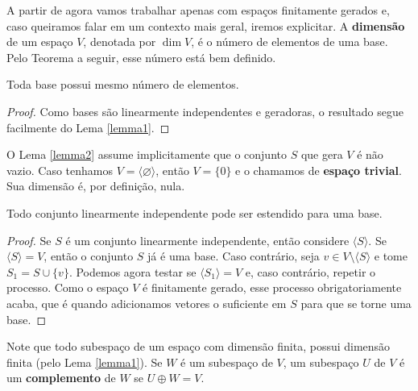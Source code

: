 A partir de agora vamos trabalhar apenas com espaços finitamente gerados e, caso queiramos falar em um contexto mais geral, iremos explicitar. A \textbf{dimensão} de um espaço $V$, denotada por $\dim V$, é o número de elementos de uma base. Pelo Teorema a seguir, esse número está bem definido.

\begin{theorem}
    Toda base possui mesmo número de elementos.
\end{theorem}
\begin{proof}
    Como bases são linearmente independentes e geradoras, o resultado segue facilmente do Lema \ref{lemma1}.
\end{proof}

O Lema \ref{lemma2} assume implicitamente que o conjunto $S$ que gera $V$ é não vazio. Caso tenhamos $V = \langle\varnothing\rangle$, então $V = \{0\}$ e o chamamos de \textbf{espaço trivial}. Sua dimensão é, por definição, nula.

\begin{theorem}
    Todo conjunto linearmente independente pode ser estendido para uma base.
\end{theorem}
\begin{proof}
    Se $S$ é um conjunto linearmente independente, então considere $\langle S \rangle$. Se $\langle S \rangle = V$, então o conjunto $S$ já é uma base. Caso contrário, seja $v \in V \setminus \langle S \rangle$ e tome $S_1 = S \cup \{v\}$. Podemos agora testar se $\langle S_1 \rangle = V$ e, caso contrário, repetir o processo. Como o espaço $V$ é finitamente gerado, esse processo obrigatoriamente acaba, que é quando adicionamos vetores o suficiente em $S$ para que se torne uma base.
\end{proof}

Note que todo subespaço de um espaço com dimensão finita, possui dimensão finita (pelo Lema \ref{lemma1}). Se $W$ é um subespaço de $V$, um subespaço $U$ de $V$ é um \textbf{complemento} de $W$ se $U \oplus W = V$.

